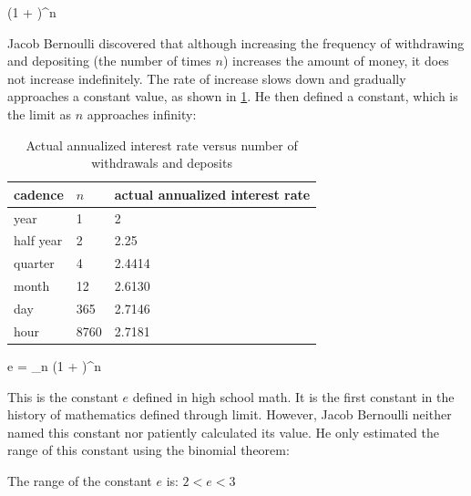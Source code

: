 \documentclass[b5paper]{article}
\begin{document}
\be
(1 + )^n
\ee

Jacob Bernoulli discovered that although increasing the frequency of withdrawing and depositing (the number of times $n$) increases the amount of money, it does not increase indefinitely. The rate of increase slows down and gradually approaches a constant value, as shown in \cref{tab:compound-interest}. He then defined a constant, which is the limit as $n$ approaches infinity:

\begin{table}[ht]
  \caption{Actual annualized interest rate versus number of withdrawals and deposits}
  \centering
  \begin{tabular}{|l|l|l|}
    \hline
    cadence & $n$ & actual annualized interest rate \\
    \hline
    year & 1 & 2 \\
    half year & 2 & 2.25 \\
    quarter & 4 & 2.4414 \\
    month & 12 & 2.6130 \\
    day & 365 & 2.7146 \\
    hour & 8760 & 2.7181 \\
    \hline
  \end{tabular}
  \label{tab:compound-interest}
\end{table}

 
\be
e = \lim_{n \to \infty} (1 + )^n
\ee

This is the constant $e$ defined in high school math. It is the first constant in the history of mathematics defined through limit. However, Jacob Bernoulli neither named this constant nor patiently calculated its value. He only estimated the range of this constant using the binomial theorem\cite{MacTour-e}:

\begin{proposition}
The range of the constant $e$ is: $2 < e < 3$
\end{proposition}
\end{document}
